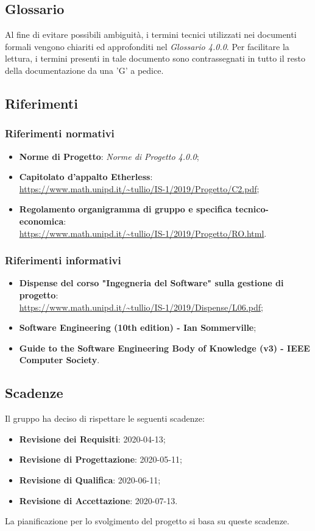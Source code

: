 \subsection{Glossario}
Al fine di evitare possibili ambiguità, i termini tecnici utilizzati nei documenti formali vengono chiariti ed approfonditi nel \textit{Glossario 4.0.0}. Per facilitare la lettura, i termini presenti in tale documento sono contrassegnati in tutto il resto della documentazione da una 'G' a pedice.
\subsection{Riferimenti}
\subsubsection{Riferimenti normativi}
\begin{itemize}
	\item \textbf{Norme di Progetto}: \textit{Norme di Progetto 4.0.0};
	\item \textbf{Capitolato d'appalto Etherless}:\\\url{https://www.math.unipd.it/~tullio/IS-1/2019/Progetto/C2.pdf};
	\item \textbf{Regolamento organigramma di gruppo e specifica tecnico-economica}:\\\url{https://www.math.unipd.it/~tullio/IS-1/2019/Progetto/RO.html}.
\end{itemize}
\subsubsection{Riferimenti informativi}
\begin{itemize}
	\item \textbf{Dispense del corso "Ingegneria del Software" sulla gestione di progetto}:\\\url{https://www.math.unipd.it/~tullio/IS-1/2019/Dispense/L06.pdf};
	\item \textbf{Software Engineering (10th edition) - Ian Sommerville};
	\item \textbf{Guide to the Software Engineering Body of Knowledge (v3) - IEEE Computer Society}.
\end{itemize}
\subsection{Scadenze}
Il gruppo \Gruppo{} ha deciso di rispettare le seguenti scadenze:
\begin{itemize}
	\item \textbf{Revisione dei Requisiti}: 2020-04-13;
	\item \textbf{Revisione di Progettazione}: 2020-05-11;
	\item \textbf{Revisione di Qualifica}: 2020-06-11;
	\item \textbf{Revisione di Accettazione}: 2020-07-13.
\end{itemize}
La pianificazione per lo svolgimento del progetto si basa su queste scadenze.
